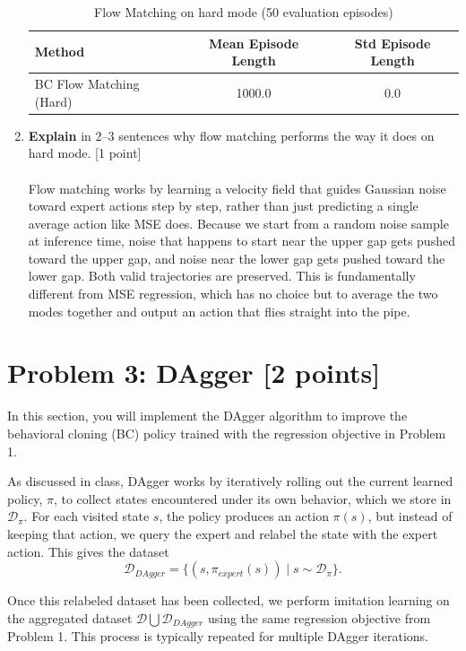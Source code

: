 \documentclass[12pt]{article}
\begin{document}
\begin{enumerate}
\begin{table}[h]
\centering
\begin{tabular}{lcc}
\hline
\textbf{Method} & \textbf{Mean Episode Length} & \textbf{Std Episode Length} \\
\hline
BC Flow Matching (Hard) & 1000.0 & 0.0 \\
\hline
\end{tabular}
\caption{Flow Matching on hard mode (50 evaluation episodes)}
\end{table}

\item \textbf{Explain} in 2--3 sentences why flow matching performs the way it does on hard mode. [1 point]\\
\\
Flow matching works by learning a velocity field that guides Gaussian noise toward expert actions step by step, rather than just predicting a single average action like MSE does. Because we start from a random noise sample at inference time, noise that happens to start near the upper gap gets pushed toward the upper gap, and noise near the lower gap gets pushed toward the lower gap. Both valid trajectories are preserved. This is fundamentally different from MSE regression, which has no choice but to average the two modes together and output an action that flies straight into the pipe.
\end{enumerate}

\section*{Problem 3: DAgger [2 points]}

In this section, you will implement the DAgger algorithm to improve the behavioral cloning (BC) policy trained with the regression objective in Problem 1.

As discussed in class, DAgger works by iteratively rolling out the current learned policy, $\pi$, to collect states encountered under its own behavior, which we store in $\mathcal{D}_\pi$. For each visited state $s$, the policy produces an action $\pi(s)$, but instead of keeping that action, we query the expert and relabel the state with the expert action. This gives the dataset
$$
\mathcal{D}_{\textit{DAgger}} = \{ (s, \pi_{\textit{expert}}(s)) \mid s \sim \mathcal{D}_{\pi} \}.
$$

Once this relabeled dataset has been collected, we perform imitation learning on the aggregated dataset $\mathcal{D} \bigcup \mathcal{D}_{\textit{DAgger}}$ using the same regression objective from Problem 1. This process is typically repeated for multiple DAgger iterations.
\end{document}
